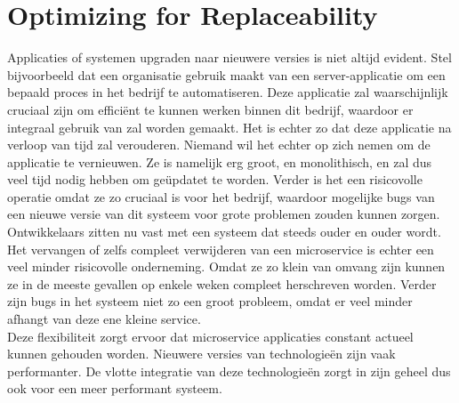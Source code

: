 \section{Optimizing for Replaceability}
\label{sec:optimizing-for-replaceability}

Applicaties of systemen upgraden naar nieuwere versies is niet altijd evident. Stel bijvoorbeeld dat een organisatie gebruik maakt van een server-applicatie om een bepaald proces in het bedrijf te automatiseren. Deze applicatie zal waarschijnlijk cruciaal zijn om efficiënt te kunnen werken binnen dit bedrijf, waardoor er integraal gebruik van zal worden gemaakt. Het is echter zo dat deze applicatie na verloop van tijd zal verouderen. Niemand wil het echter op zich nemen om de applicatie te vernieuwen. Ze is namelijk erg groot, en monolithisch, en zal dus veel tijd nodig hebben om geüpdatet te worden. Verder is het een risicovolle operatie omdat ze zo cruciaal is voor het bedrijf, waardoor mogelijke bugs van een nieuwe versie van dit systeem voor grote problemen zouden kunnen zorgen. Ontwikkelaars zitten nu vast met een systeem dat steeds ouder en ouder wordt.
\\
Het vervangen of zelfs compleet verwijderen van een microservice is echter een veel minder risicovolle onderneming. Omdat ze zo klein van omvang zijn kunnen ze in de meeste gevallen op enkele weken compleet herschreven worden. Verder zijn bugs in het systeem niet zo een groot probleem, omdat er veel minder afhangt van deze ene kleine service.
\\
Deze flexibiliteit zorgt ervoor dat microservice applicaties constant actueel kunnen gehouden worden. Nieuwere versies van technologieën zijn vaak performanter. De vlotte integratie van deze technologieën zorgt in zijn geheel dus ook voor een meer performant systeem.